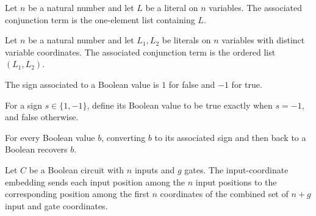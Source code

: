 \begin{definition}
\label{FABL.DNFTerm.ofOne}
\leanok
{}
Let $n$ be a natural number and let $L$ be a literal on $n$ variables. The associated
conjunction term is the one-element list containing $L$.
\end{definition}

\begin{definition}
\label{FABL.DNFTerm.ofTwo}
\leanok
{}
Let $n$ be a natural number and let $L_1,L_2$ be literals on $n$ variables with distinct
variable coordinates. The associated conjunction term is the ordered list $(L_1,L_2)$.
\end{definition}

\begin{definition}
\label{FABL.signOfBool}
\leanok
{}
The sign associated to a Boolean value is $1$ for false and $-1$ for true.
\end{definition}

\begin{definition}
\label{FABL.boolOfSign}
\leanok
{}
For a sign $s\in\{1,-1\}$, define its Boolean value to be true exactly when $s=-1$, and
false otherwise.
\end{definition}

\begin{theorem}
\label{FABL.boolOfSign_signOfBool}
\leanok
{}
For every Boolean value $b$, converting $b$ to its associated sign and then back to a
Boolean recovers $b$.
\end{theorem}

\begin{definition}
\label{FABL.BooleanCircuit.inputCoordinate}
\leanok
{}
Let $C$ be a Boolean circuit with $n$ inputs and $g$ gates. The input-coordinate
embedding sends each input position among the $n$ input positions to the corresponding
position among the first $n$ coordinates of the combined set of $n+g$ input and gate
coordinates.
\end{definition}

